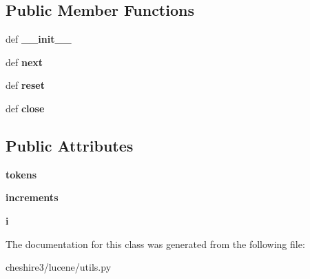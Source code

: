 \subsection*{Public Member Functions}
\begin{DoxyCompactItemize}
\item 
\hypertarget{classcheshire3_1_1lucene_1_1utils_1_1_simple_token_stream_abd9d3effb5b76e1bd11cfb61432e85fd}{def {\bfseries \-\_\-\-\_\-init\-\_\-\-\_\-}}\label{classcheshire3_1_1lucene_1_1utils_1_1_simple_token_stream_abd9d3effb5b76e1bd11cfb61432e85fd}

\item 
\hypertarget{classcheshire3_1_1lucene_1_1utils_1_1_simple_token_stream_ae2a95abc1413bc732270078c4ec304fa}{def {\bfseries next}}\label{classcheshire3_1_1lucene_1_1utils_1_1_simple_token_stream_ae2a95abc1413bc732270078c4ec304fa}

\item 
\hypertarget{classcheshire3_1_1lucene_1_1utils_1_1_simple_token_stream_a97eb92b8709acdeff0a4480cf8ca1fe7}{def {\bfseries reset}}\label{classcheshire3_1_1lucene_1_1utils_1_1_simple_token_stream_a97eb92b8709acdeff0a4480cf8ca1fe7}

\item 
\hypertarget{classcheshire3_1_1lucene_1_1utils_1_1_simple_token_stream_a7e0e7e271abbbffa61f11fa7522ec796}{def {\bfseries close}}\label{classcheshire3_1_1lucene_1_1utils_1_1_simple_token_stream_a7e0e7e271abbbffa61f11fa7522ec796}

\end{DoxyCompactItemize}
\subsection*{Public Attributes}
\begin{DoxyCompactItemize}
\item 
\hypertarget{classcheshire3_1_1lucene_1_1utils_1_1_simple_token_stream_ac7081e65736e4873b3edfdc40b5093fd}{{\bfseries tokens}}\label{classcheshire3_1_1lucene_1_1utils_1_1_simple_token_stream_ac7081e65736e4873b3edfdc40b5093fd}

\item 
\hypertarget{classcheshire3_1_1lucene_1_1utils_1_1_simple_token_stream_a0912184eb3087bd5c7df91829e1bb128}{{\bfseries increments}}\label{classcheshire3_1_1lucene_1_1utils_1_1_simple_token_stream_a0912184eb3087bd5c7df91829e1bb128}

\item 
\hypertarget{classcheshire3_1_1lucene_1_1utils_1_1_simple_token_stream_ade79b1c419fbe6416cc8142627b095c5}{{\bfseries i}}\label{classcheshire3_1_1lucene_1_1utils_1_1_simple_token_stream_ade79b1c419fbe6416cc8142627b095c5}

\end{DoxyCompactItemize}


The documentation for this class was generated from the following file\-:\begin{DoxyCompactItemize}
\item 
cheshire3/lucene/utils.\-py\end{DoxyCompactItemize}
